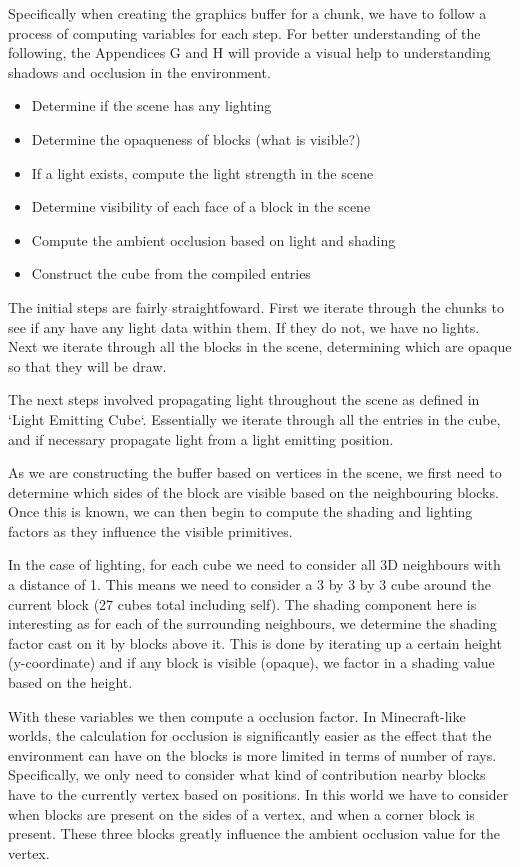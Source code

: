 \documentclass{book}
\begin{document}
Specifically when creating the graphics buffer for a chunk, we have to follow a process of computing variables for each step.  For better understanding of the following, the Appendices G and H will provide a visual help to understanding shadows and occlusion in the environment.
    
\begin{itemize}
	\item Determine if the scene has any lighting
	\item Determine the opaqueness of blocks (what is visible?)
	\item If a light exists, compute the light strength in the scene
	\item Determine visibility of each face of a block in the scene
	\item Compute the ambient occlusion based on light and shading
	\item Construct the cube from the compiled entries
\end{itemize}
    
The initial steps are fairly straightfoward.  First we iterate through the chunks to see if any have any light data within them.  If they do not, we have no lights.  Next we iterate through all the blocks in the scene, determining which are opaque so that they will be draw.
    
The next steps involved propagating light throughout the scene as defined in `Light Emitting Cube`. Essentially we iterate through all the entries in the cube, and if necessary propagate light from a light emitting position.
    
As we are constructing the buffer based on vertices in the scene, we first need to determine which sides of the block are visible based on the neighbouring blocks.  Once this is known, we can then begin to compute the shading and lighting factors as they influence the visible primitives.
    
In the case of lighting, for each cube we need to consider all 3D neighbours with a distance of 1.  This means we need to consider a 3 by 3 by 3 cube around the current block (27 cubes total including self).  The shading component here is interesting as for each of the surrounding neighbours, we determine the shading factor cast on it by blocks above it.  This is done by iterating up a certain height (y-coordinate) and if any block is visible (opaque), we factor in a shading value based on the height.
    
With these variables we then compute a occlusion factor.  In Minecraft-like worlds, the calculation for occlusion is significantly easier as the effect that the environment can have on the blocks is more limited in terms of number of rays.  Specifically, we only need to consider what kind of contribution nearby blocks have to the currently vertex based on positions.  In this world we have to consider when blocks are present on the sides of a vertex, and when a corner block is present.  These three blocks greatly influence the ambient occlusion value for the vertex.
    
\end{document}
